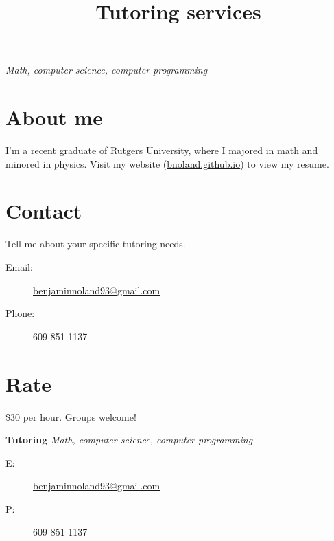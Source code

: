 \documentclass{article}
\title{\fontsize{50}{0}\selectfont \vspace{-2ex}\textbf{Tutoring services}\vspace{-1.5ex}}
\author{}
\date{}
\begin{document}
\maketitle

\Huge

\begin{center}
{\Huge \emph{Math, computer science, computer programming}}
\end{center}

\section*{About me}

I'm a recent graduate of Rutgers University, where I majored in math and minored in physics. Visit my website (\url{bnoland.github.io}) to view my resume.

\section*{Contact}

Tell me about your specific tutoring needs.
\medskip
\begin{description}
\item[Email:] \url{benjaminnoland93@gmail.com}
\item[Phone:] 609-851-1137
\end{description}

\section*{Rate}

\$30 per hour. Groups welcome!

\stubs[10]{5.2cm}
{
\small
\textbf{Tutoring} \emph{Math, computer science, computer programming}
\begin{description}
\item[E:] \url{benjaminnoland93@gmail.com}
\item[P:] 609-851-1137
\end{description}
}
\end{document}
